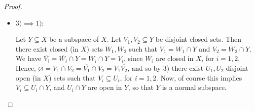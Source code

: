 \documentclass[12pt]{extarticle}
\newcommand{\<}{\langle}
\renewcommand{\>}{\rangle}
\renewcommand{\emptyset}{\varnothing}
\theoremstyle{definition}
\begin{document}
\begin{proof}
\begin{itemize}
  \item $3) \implies 1)$:
    
    Let $Y \subseteq X$ be a subspace of $X$. Let $V_1, V_2 \subseteq Y$ be disjoint closed sets. Then there exist closed (in $X$) sets $W_1, W_2$ such that
    $V_1 = W_1 \cap Y$ and $V_2 = W_2 \cap Y$. We have $\overline{V_i} = \overline{W_i} \cap Y = W_i \cap Y = V_i $, since $W_i$ are closed in $X$, for $i=1,2$.
    Hence, $\emptyset = V_1 \cap V_2 = \overline{V_1} \cap V_2 = V_1 \overline{V_2}$, and so by 3) there exist $U_1, U_2$ disjoint open (in $X$) sets such that
    $V_i \subseteq U_i$, for $i=1,2$. Now, of course this implies $V_i \subseteq U_i \cap Y$, and $U_i \cap Y$ are open in $Y$, so that $Y$ is a normal subspace. 
  \end{itemize}
\end{proof}
\end{document}
